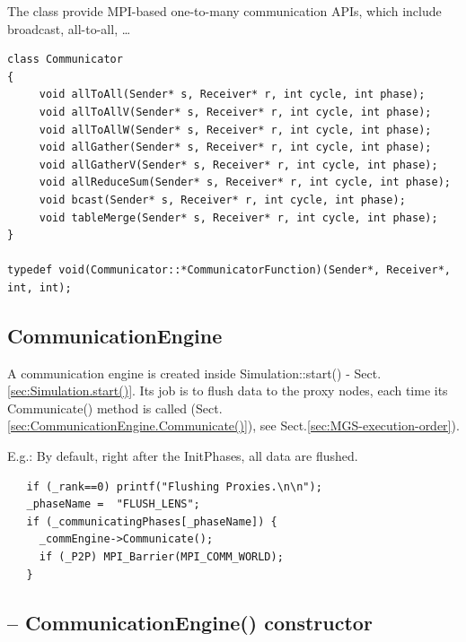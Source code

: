The class provide MPI-based one-to-many communication APIs, which include
broadcast, all-to-all, \ldots

\begin{verbatim}
class Communicator
{
     void allToAll(Sender* s, Receiver* r, int cycle, int phase);   
     void allToAllV(Sender* s, Receiver* r, int cycle, int phase);   
     void allToAllW(Sender* s, Receiver* r, int cycle, int phase);   
     void allGather(Sender* s, Receiver* r, int cycle, int phase);   
     void allGatherV(Sender* s, Receiver* r, int cycle, int phase);   
     void allReduceSum(Sender* s, Receiver* r, int cycle, int phase);
     void bcast(Sender* s, Receiver* r, int cycle, int phase);
     void tableMerge(Sender* s, Receiver* r, int cycle, int phase);
}

typedef void(Communicator::*CommunicatorFunction)(Sender*, Receiver*, int, int);
\end{verbatim}


\subsection{CommunicationEngine}
\label{sec:CommunicationEngine}


A communication engine is created inside
Simulation::start() - Sect.\ref{sec:Simulation.start()}.
Its job is to flush data to the proxy nodes, each time its Communicate() method
is called (Sect.\ref{sec:CommunicationEngine.Communicate()}), see
Sect.\ref{sec:MGS-execution-order}).

E.g.: By default, right after the InitPhases, all data are flushed.
\begin{verbatim}
   if (_rank==0) printf("Flushing Proxies.\n\n");
   _phaseName =  "FLUSH_LENS";
   if (_communicatingPhases[_phaseName]) {
     _commEngine->Communicate();
     if (_P2P) MPI_Barrier(MPI_COMM_WORLD);
   }
\end{verbatim}


\subsection{-- CommunicationEngine() constructor}
\label{sec:CommunicationEngine-constructor}

